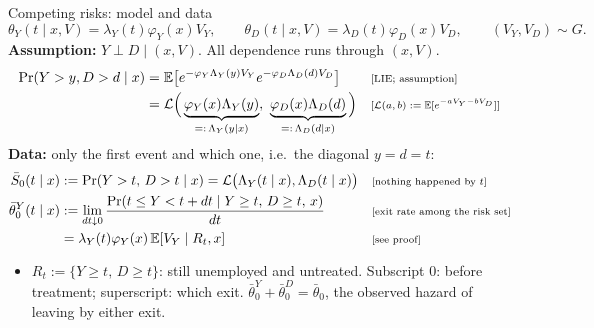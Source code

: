 \documentclass[aspectratio=169,10pt]{beamer}
\newcommand{\E}{\mathbb{E}}
\newcommand{\Lap}{\mathcal{L}}
\newcommand{\why}[1]{\text{\scriptsize[#1]}}
\begin{document}
\begin{frame}[label=m-race]{Competing risks: model and data}
  \small
  \[ \theta_Y(t\mid x,V)=\lambda_Y(t)\varphi_Y(x)V_Y,\qquad \theta_D(t\mid x,V)=\lambda_D(t)\varphi_D(x)V_D,\qquad (V_Y,V_D)\sim G. \]
  \textbf{Assumption:} $Y\perp D\mid(x,V)$. All dependence runs through $(x,V)$.
  \begin{align*}
    \Pr(Y>y,D>d\mid x) &= \E\big[e^{-\varphi_Y\Lambda_Y(y)V_Y}e^{-\varphi_D\Lambda_D(d)V_D}\big] && \why{LIE; assumption} \\
    &= \Lap\Big(\underbrace{\varphi_Y(x)\Lambda_Y(y)}_{=:\,\Lambda_Y(y\mid x)},\ \underbrace{\varphi_D(x)\Lambda_D(d)}_{=:\,\Lambda_D(d\mid x)}\Big) && \why{$\Lap(a,b):=\E[e^{-aV_Y-bV_D}]$}
  \end{align*}
  \textbf{Data:} only the first event and which one, i.e.\ the diagonal $y=d=t$:
  \begin{align*}
    \bar S_0(t\mid x) &:= \Pr(Y>t,\,D>t\mid x) = \Lap\big(\Lambda_Y(t\mid x),\Lambda_D(t\mid x)\big) && \why{nothing happened by $t$} \\
    \bar\theta^Y_0(t\mid x) &:= \lim_{dt\downarrow0}\frac{\Pr(t\le Y<t+dt\mid Y\ge t,\,D\ge t,\,x)}{dt} && \why{exit rate among the risk set} \\
    &= \lambda_Y(t)\varphi_Y(x)\,\E[V_Y\mid R_t,x] && \why{see proof}
  \end{align*}
  \begin{itemize}
    \item $R_t:=\{Y\ge t,\,D\ge t\}$: still unemployed and untreated. Subscript $0$: before treatment; superscript: which exit. $\bar\theta^Y_0+\bar\theta^D_0=\bar\theta_0$, the observed hazard of leaving by either exit.
  \end{itemize}
  \vfill\hfill\hyperlink{p-race}{}
\end{frame}
\end{document}
